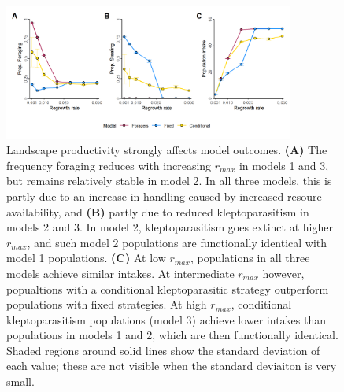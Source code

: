 \documentclass[11pt]{article}
\begin{document}
\begin{figure}[h!]
    \centering
    \includegraphics[width=0.85\textwidth]{figures/fig_06.png}
    \caption{Landscape productivity strongly affects model outcomes.
    \textbf{(A)} The frequency foraging reduces with increasing $r_{max}$ in models 1 and 3, but remains relatively stable in model 2. In all three models, this is partly due to an increase in handling caused by increased resoure availability, and \textbf{(B)} partly due to reduced kleptoparasitism in models 2 and 3. In model 2, kleptoparasitism goes extinct at higher $r_{max}$, and such model 2 populations are functionally identical with model 1 populations.
    \textbf{(C)} At low $r_{max}$, populations in all three models achieve similar intakes. At intermediate $r_{max}$ however, popualtions with a conditional kleptoparasitic strategy outperform populations with fixed strategies. At high $r_{max}$, conditional kleptoparasitism populations (model 3) achieve lower intakes than populations in models 1 and 2, which are then functionally identical.
    Shaded regions around solid lines show the standard deviation of each value; these are not visible when the standard deviaiton is very small.
    }
    \label{Fig:Sensitivity}
\end{figure}
\end{document}
